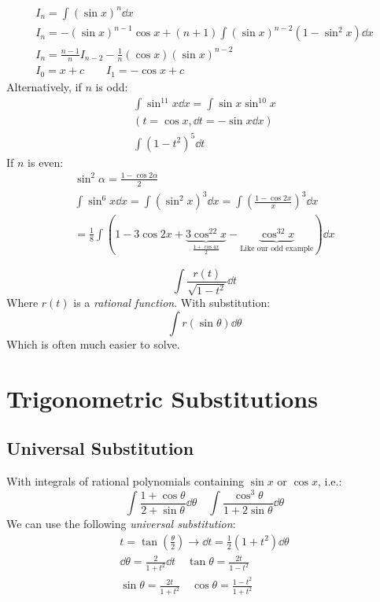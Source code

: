 \documentclass[00_complete]{subfiles}
\begin{document}
\begin{example}
    $$
    \begin{gathered}
        I_n=\int (\sin x)^n \dd{x} \\
        I_n=-(\sin x)^{n-1}\cos x +(n+1) \int (\sin x)^{n-2}(1-\sin^2 x) \dd{x}
        \\
        I_n=\frac{n-1}{n}I_{n-2}-\frac{1}{n}(\cos x)(\sin x)^{n-2} \\
        I_0 = x+c \qquad I_1=-\cos x+c
    \end{gathered}
    $$
    Alternatively, if $n$ is odd:
    $$
    \begin{gathered}
        \int \sin^{11} x \dd{x} = \int \sin x \sin^{10} x \\
        (t=\cos x, \dd{t}=-\sin x \dd{x}) \\
        \int (1-t^2)^5 \dd{t}
    \end{gathered}
    $$
    If $n$ is even:
    $$
    \begin{gathered}
        \sin^2 \alpha = \frac{1-\cos 2\alpha}{2}\\
        \int \sin^6 x \dd{x} = \int (\sin^2 x)^3 \dd{x} =
        \int \left(\frac{1-\cos 2 x}{x}\right)^3\dd{x} \\
        = \frac{1}{8} \int (1-3\cos 2x+\underbrace{3\cos^22x}_{\frac{1+\cos
        4x}{2}}-\underbrace{\cos^32x}_{\text{Like our odd example}}) \dd{x}
    \end{gathered}
    $$
\end{example}
\begin{example}
    $$\int \frac{r(t)}{\sqrt{1-t^2}}\dd{t}$$
    Where $r(t)$ is a \emph{rational function}. With substitution:
    $$\int r(\sin \theta) \dd{\theta}$$
    Which is often much easier to solve.
\end{example}
\section{Trigonometric Substitutions}
\subsection{Universal Substitution}
With integrals of rational polynomials containing $\sin x$ or $\cos x$, i.e.:
$$\int \frac{1+\cos \theta}{2+\sin \theta}\dd{\theta}\quad \int
\frac{\cos^3\theta}{1+2\sin \theta} \dd{\theta}$$
We can use the following \emph{universal substitution}:
$$
\begin{gathered}
    t=\tan \left(\frac{\theta}{2}\right) \to \dd{t} =
    \frac{1}{2}(1+t^2)\dd{\theta} \\
    \dd{\theta} = \frac{2}{1+t^2}\dd{t} \quad \tan \theta = \frac{2t}{1-t^2} \\
    \sin \theta = \frac{2t}{1+t^2} \quad \cos \theta = \frac{1-t^2}{1+t^2}
\end{gathered}
$$
\end{document}

